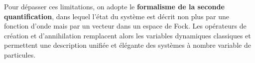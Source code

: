 Pour dépasser ces limitations, on adopte le \textbf{formalisme de la seconde quantification}, dans lequel l’état du système est décrit non plus par une fonction d’onde mais par un vecteur dans un espace de Fock. Les opérateurs de création et d’annihilation remplacent alors les variables dynamiques classiques et permettent une description unifiée et élégante des systèmes à nombre variable de particules.


